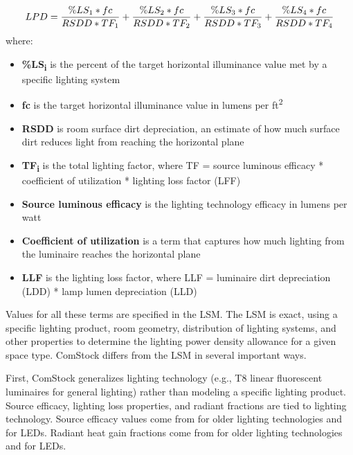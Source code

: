 \begin{align}
\label{lsm_lpd_eqn}
LPD = {\% LS_{1} * fc \over RSDD * TF_{1}} + {\% LS_{2} * fc \over RSDD * TF_{2}} + {\% LS_{3} * fc \over RSDD * TF_{3}} + {\% LS_{4} * fc \over RSDD * TF_{4}}
\end{align}
where:\\
\begin{itemize}
\item \textbf{\%LS\textsubscript{i}} is the percent of the target horizontal illuminance value met by a specific lighting system\\
\item \textbf{fc} is the target horizontal illuminance value in lumens per ft\textsuperscript{2}\\
\item \textbf{RSDD} is room surface dirt depreciation, an estimate of how much surface dirt reduces light from reaching the horizontal plane\\
\item \textbf{TF\textsubscript{i}} is the total lighting factor, where TF = source luminous efficacy * coefficient of utilization * lighting loss factor (LFF)\\
\item \textbf{Source luminous efficacy} is the lighting technology efficacy in lumens per watt\\
\item \textbf{Coefficient of utilization} is a term that captures how much lighting from the luminaire reaches the horizontal plane\\
\item \textbf{LLF} is the lighting loss factor, where LLF  = luminaire dirt depreciation (LDD) * lamp lumen depreciation (LLD)\\
\end{itemize}

Values for all these terms are specified in the LSM.  The LSM is exact, using a specific lighting product, room geometry, distribution of lighting systems, and other properties to determine the lighting power density allowance for a given space type. ComStock differs from the LSM in several important ways. 

First, ComStock generalizes lighting technology (e.g., T8 linear fluorescent luminaires for general lighting) rather than modeling a specific lighting product.  Source efficacy, lighting loss properties, and radiant fractions are tied to lighting technology. Source efficacy values come from \cite{doe2015lmc} for older lighting technologies and \cite{doe2019ssl} for LEDs.  Radiant heat gain fractions come from \cite{ashrae_rp1282} for older lighting technologies and \cite{ashrae_rp1681} for LEDs.


